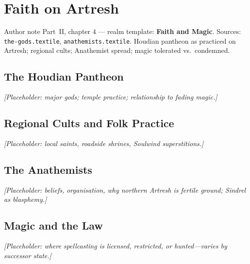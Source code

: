 \chapter{Faith on Artresh}

\begin{DndComment}{Author note}
  Part~II, chapter 4 --- realm template: \textbf{Faith and Magic}.
  Sources: \texttt{the-gods.textile}, \texttt{anathemists.textile}.
  Houdian pantheon as practiced on Artresh; regional cults; Anathemist spread; magic tolerated vs.\ condemned.
\end{DndComment}

\section{The Houdian Pantheon}

\textit{[Placeholder: major gods; temple practice; relationship to fading magic.]}

\section{Regional Cults and Folk Practice}

\textit{[Placeholder: local saints, roadside shrines, Soulwind superstitions.]}

\section{The Anathemists}

\textit{[Placeholder: beliefs, organisation, why northern Artresh is fertile ground; Sindrel as blasphemy.]}

\section{Magic and the Law}

\textit{[Placeholder: where spellcasting is licensed, restricted, or hunted---varies by successor state.]}
